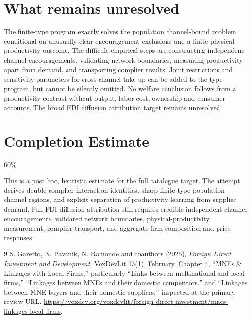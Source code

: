 \documentclass[11pt]{article}
\begin{document}
\section{What remains unresolved}
The finite-type program exactly solves the population channel-bound
problem conditional on unusually clear encouragement exclusions and a
finite physical-productivity outcome. The difficult empirical steps are
constructing independent channel encouragements, validating network
boundaries, measuring productivity apart from demand, and transporting
complier results. Joint restrictions and sensitivity parameters for
cross-channel take-up can be added to the type program, but cannot be
silently omitted. No welfare conclusion follows from a productivity
contrast without output, labor-cost, ownership and consumer accounts.
The broad FDI diffusion attribution target remains unresolved.

\section{Completion Estimate}
60\%

This is a post hoc, heuristic estimate for the full catalogue target.
The attempt derives double-complier interaction identities, sharp finite-type population channel regions, and explicit separation of productivity learning from supplier demand. Full FDI diffusion attribution still requires credible independent channel encouragements, validated network boundaries, physical-productivity measurement, complier transport, and aggregate firm-composition and price responses.

\begin{thebibliography}{9}
 S. Garetto, N. Pavcnik, N. Ramondo and coauthors (2025),
\emph{Foreign Direct Investment and Development}, VoxDevLit 13(1),
February. Chapter 4, ``MNEs \& Linkages with Local Firms,'' particularly
``Links between multinational and local firms,'' ``Linkages between MNEs
and their domestic competitors,'' and ``Linkages between MNE buyers and
their domestic suppliers,'' inspected at the primary review URL.
\url{https://voxdev.org/voxdevlit/foreign-direct-investment/mnes-linkages-local-firms}.
\end{thebibliography}
\end{document}
